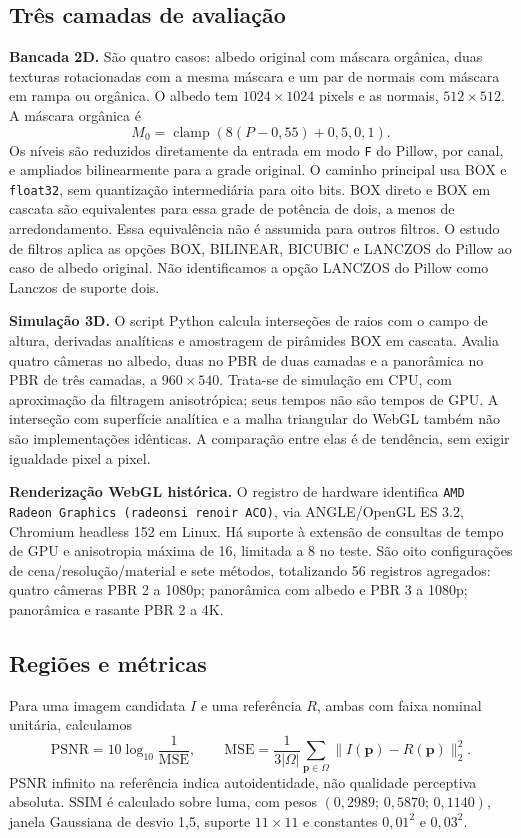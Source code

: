 \subsection{Três camadas de avaliação}
\textbf{Bancada 2D.} São quatro casos: albedo original com máscara orgânica, duas texturas rotacionadas com a mesma máscara e um par de normais com máscara em rampa ou orgânica. O albedo tem $1024\times1024$ pixels e as normais, $512\times512$. A máscara orgânica é
\begin{equation}
M_0=\operatorname{clamp}(8(P-0{,}55)+0{,}5,0,1).
\end{equation}
Os níveis são reduzidos diretamente da entrada em modo \texttt{F} do Pillow, por canal, e ampliados bilinearmente para a grade original. O caminho principal usa BOX e \texttt{float32}, sem quantização intermediária para oito bits. BOX direto e BOX em cascata são equivalentes para essa grade de potência de dois, a menos de arredondamento. Essa equivalência não é assumida para outros filtros. O estudo de filtros aplica as opções BOX, BILINEAR, BICUBIC e LANCZOS do Pillow ao caso de albedo original. Não identificamos a opção LANCZOS do Pillow como Lanczos de suporte dois.

\textbf{Simulação 3D.} O script Python calcula interseções de raios com o campo de altura, derivadas analíticas e amostragem de pirâmides BOX em cascata. Avalia quatro câmeras no albedo, duas no PBR de duas camadas e a panorâmica no PBR de três camadas, a $960\times540$. Trata-se de simulação em CPU, com aproximação da filtragem anisotrópica; seus tempos não são tempos de GPU. A interseção com superfície analítica e a malha triangular do WebGL também não são implementações idênticas. A comparação entre elas é de tendência, sem exigir igualdade pixel a pixel.

\textbf{Renderização WebGL histórica.} O registro de hardware identifica \texttt{AMD Radeon Graphics (radeonsi renoir ACO)}, via ANGLE/OpenGL ES 3.2, Chromium headless 152 em Linux. Há suporte à extensão de consultas de tempo de GPU e anisotropia máxima de 16, limitada a 8 no teste. São oito configurações de cena/resolução/material e sete métodos, totalizando 56 registros agregados: quatro câmeras PBR 2 a 1080p; panorâmica com albedo e PBR 3 a 1080p; panorâmica e rasante PBR 2 a 4K.

\subsection{Regiões e métricas}
Para uma imagem candidata $I$ e uma referência $R$, ambas com faixa nominal unitária, calculamos
\begin{equation}
\mathrm{PSNR}=10\log_{10}\frac{1}{\mathrm{MSE}},\qquad
\mathrm{MSE}=\frac{1}{3|\Omega|}\sum_{\mathbf p\in\Omega}\|I(\mathbf p)-R(\mathbf p)\|_2^2.
\label{eq:psnr}
\end{equation}
PSNR infinito na referência indica autoidentidade, não qualidade perceptiva absoluta. SSIM \citep{wang2004ssim} é calculado sobre luma, com pesos $(0{,}2989;\,0{,}5870;\,0{,}1140)$, janela Gaussiana de desvio 1,5, suporte $11\times11$ e constantes $0{,}01^2$ e $0{,}03^2$.

